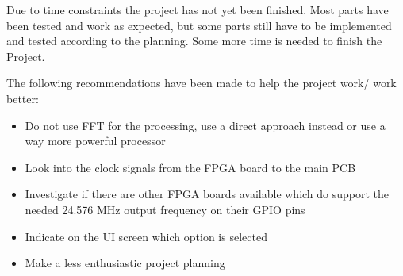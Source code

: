 Due to time constraints the project has not yet been finished. Most parts have been tested and work as expected, but some parts still have to be implemented and tested according to the planning. Some more time is needed to finish the Project.
\par
\noindent The following recommendations have been made to help the project work/ work better:

\begin{itemize}
    \setlength\itemsep{-0.3em} %
    \item Do not use FFT for the processing, use a direct approach instead or use a way more powerful processor
    \item Look into the clock signals from the FPGA board to the main PCB
    \item Investigate if there are other FPGA boards available which do support the needed 24.576 MHz output frequency on their GPIO pins
    \item Indicate on the UI screen which option is selected
    \item Make a less enthusiastic project planning
\end{itemize}